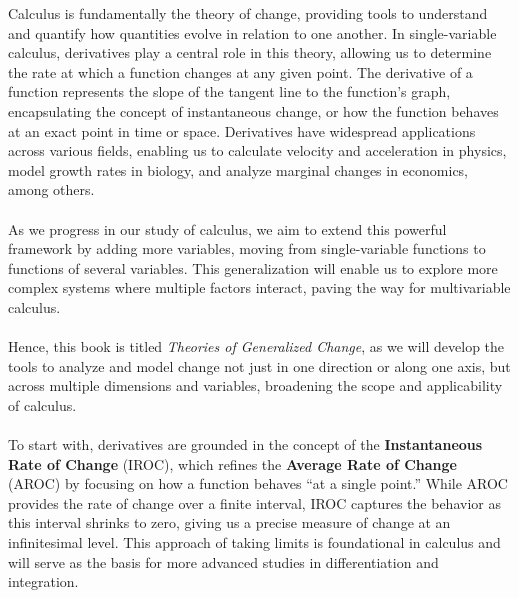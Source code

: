 Calculus is fundamentally the theory of change, providing tools to understand and quantify how quantities evolve in relation to one another. In single-variable calculus, derivatives play a central role in this theory, allowing us to determine the rate at which a function changes at any given point. The derivative of a function represents the slope of the tangent line to the function’s graph, encapsulating the concept of instantaneous change, or how the function behaves at an exact point in time or space. Derivatives have widespread applications across various fields, enabling us to calculate velocity and acceleration in physics, model growth rates in biology, and analyze marginal changes in economics, among others. \\ \\ As we progress in our study of calculus, we aim to extend this powerful framework by adding more variables, moving from single-variable functions to functions of several variables. This generalization will enable us to explore more complex systems where multiple factors interact, paving the way for multivariable calculus.\\ \\
\noindent Hence, this book is titled \textit{Theories of Generalized Change}, as we will develop the tools to analyze and model change not just in one direction or along one axis, but across multiple dimensions and variables, broadening the scope and applicability of calculus. \\ \\ To start with, derivatives are grounded in the concept of the \textbf{Instantaneous Rate of Change} (IROC), which refines the \textbf{Average Rate of Change} (AROC) by focusing on how a function behaves “at a single point.” While AROC provides the rate of change over a finite interval, IROC captures the behavior as this interval shrinks to zero, giving us a precise measure of change at an infinitesimal level. This approach of taking limits is foundational in calculus and will serve as the basis for more advanced studies in differentiation and integration.


